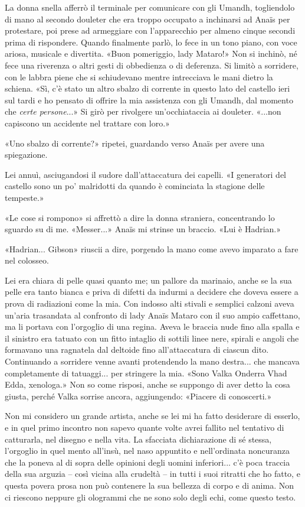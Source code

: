 La donna snella afferrò il terminale per comunicare con gli Umandh,
togliendolo di mano al secondo douleter che era troppo occupato a
inchinarsi ad Anaïs per protestare, poi prese ad armeggiare con
l'apparecchio per almeno cinque secondi prima di rispondere. Quando
finalmente parlò, lo fece in un tono piano, con voce ariosa, musicale e
divertita. «Buon pomeriggio, lady Mataro!» Non si inchinò, né fece una
riverenza o altri gesti di obbedienza o di deferenza. Si limitò a
sorridere, con le labbra piene che si schiudevano mentre intrecciava le
mani dietro la schiena. «Sì, c'è stato un altro sbalzo di corrente in
questo lato del castello ieri sul tardi e ho pensato di offrire la mia
assistenza con gli Umandh, dal momento che \emph{certe persone}...» Si
girò per rivolgere un'occhiataccia ai douleter. «...non capiscono un
accidente nel trattare con loro.»

«Uno sbalzo di corrente?» ripetei, guardando verso Anaïs per avere una
spiegazione.

Lei annuì, asciugandosi il sudore dall'attaccatura dei capelli. «I
generatori del castello sono un po' malridotti da quando è cominciata la
stagione delle tempeste.»

«Le cose si rompono» si affrettò a dire la donna straniera, concentrando
lo sguardo su di me. «Messer...» Anaïs mi strinse un braccio. «Lui è
Hadrian.»

«Hadrian... Gibson» riuscii a dire, porgendo la mano come avevo imparato
a fare nel colosseo.

Lei era chiara di pelle quasi quanto me; un pallore da marinaio, anche
se la sua pelle era tanto bianca e priva di difetti da indurmi a
decidere che doveva essere a prova di radiazioni come la mia. Con
indosso alti stivali e semplici calzoni aveva un'aria trasandata al
confronto di lady Anaïs Mataro con il suo ampio caffettano, ma li
portava con l'orgoglio di una regina. Aveva le braccia nude fino alla
spalla e il sinistro era tatuato con un fitto intaglio di sottili linee
nere, spirali e angoli che formavano una ragnatela dal deltoide fino
all'attaccatura di ciascun dito. Continuando a sorridere venne avanti
protendendo la mano destra... che mancava completamente di tatuaggi...
per stringere la mia. «Sono Valka Onderra Vhad Edda, xenologa.» Non so
come risposi, anche se suppongo di aver detto la cosa giusta, perché
Valka sorrise ancora, aggiungendo: «Piacere di conoscerti.»

Non mi considero un grande artista, anche se lei mi ha fatto desiderare
di esserlo, e in quel primo incontro non sapevo quante volte avrei
fallito nel tentativo di catturarla, nel disegno e nella vita. La
sfacciata dichiarazione di sé stessa, l'orgoglio in quel mento all'insù,
nel naso appuntito e nell'ordinata noncuranza che la poneva al di sopra
delle opinioni degli uomini inferiori... c'è poca traccia della sua
arguzia -- così vicina alla crudeltà -- in tutti i suoi ritratti che ho
fatto, e questa povera prosa non può contenere la sua bellezza di corpo
e di anima. Non ci riescono neppure gli ologrammi che ne sono solo degli
echi, come questo testo.

